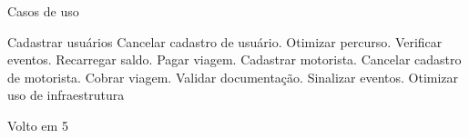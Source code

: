 \documentclass{article}
\begin{document}
Casos de uso

	Cadastrar usuários
	Cancelar cadastro de usuário.
	Otimizar percurso.
	Verificar eventos.
	Recarregar saldo.
	Pagar viagem.
	Cadastrar motorista.
	Cancelar cadastro de motorista.
	Cobrar viagem.
	Validar documentação.
	Sinalizar eventos.
	Otimizar uso de infraestrutura

	Volto em 5
\end{document}
